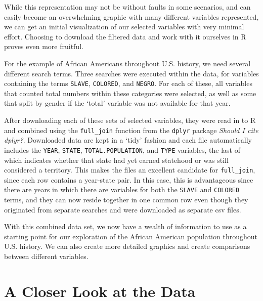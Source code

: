 \documentclass[DIV=calc, paper=a4, fontsize=10pt, twocolumn]{scrartcl}\usepackage[]{graphicx}\usepackage[]{color}
\begin{document}
\par While this representation may not be without faults in some scenarios, and can easily become an overwhelming graphic with many different variables represented, we can get an initial visualization of our selected variables with very minimal effort. Choosing to download the filtered data and work with it ourselves in R proves even more fruitful.  

\par For the example of African Americans throughout U.S. history, we need several different search terms. Three searches were executed within the data, for variables containing the terms \texttt{SLAVE}, \texttt{COLORED}, and \texttt{NEGRO}. For each of these, all variables that counted total numbers within these categories were selected, as well as some that split by gender if the `total' variable was not available for that year. 

\par After downloading each of these sets of selected variables, they were read in to R and combined using the \texttt{full\_join} function from the \texttt{dplyr} package \textit{Should I cite dplyr?}. Downloaded data are kept in a `tidy' fashion and each file automatically includes the \texttt{YEAR}, \texttt{STATE}, \texttt{TOTAL.POPULATION}, and \texttt{TYPE} variables, the last of which indicates whether that state had yet earned statehood or was still considered a territory. This makes the files an excellent candidate for \texttt{full\_join}, since each row contains a year-state pair. In this case, this is advantageous since there are years in which there are variables for both the \texttt{SLAVE} and \texttt{COLORED} terms, and they can now reside together in one common row even though they originated from separate searches and were downloaded as separate csv files. 

\par With this combined data set, we now have a wealth of information to use as a starting point for our exploration of the African American population throughout U.S. history. We can also create more detailed graphics and create comparisons between different variables.  

\section*{A Closer Look at the Data}
\end{document}
